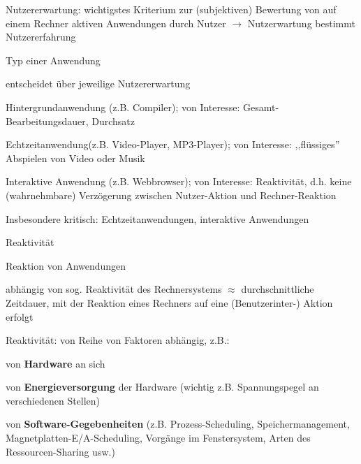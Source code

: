 \documentclass[a4paper]{article}
\begin{document}
\begin{multicols}{3}
    \begin{itemize*}
        \item
        Nutzererwartung: wichtigstes Kriterium zur (subjektiven) Bewertung von
        auf einem Rechner aktiven Anwendungen durch Nutzer
        $\rightarrow$ Nutzerwartung bestimmt Nutzererfahrung
        \item
        Typ einer Anwendung
        \begin{itemize*}
            \item entscheidet über jeweilige Nutzererwartung \begin{enumerate*} \item Hintergrundanwendung (z.B. Compiler); von Interesse: Gesamt-Bearbeitungsdauer, Durchsatz \item Echtzeitanwendung(z.B. Video-Player, MP3-Player); von Interesse: ,,flüssiges'' Abspielen von Video oder Musik \item Interaktive Anwendung (z.B. Webbrowser); von Interesse: Reaktivität, d.h. keine (wahrnehmbare) Verzögerung zwischen Nutzer-Aktion und Rechner-Reaktion \end{enumerate*}
            \item Insbesondere kritisch: Echtzeitanwendungen, interaktive Anwendungen
        \end{itemize*}
    \end{itemize*}

    Reaktivität

    \begin{itemize*}
        \item
        Reaktion von Anwendungen
        \begin{itemize*}
            \item abhängig von sog. Reaktivität des Rechnersystems $\approx$ durchschnittliche Zeitdauer, mit der Reaktion eines Rechners auf eine (Benutzerinter-) Aktion erfolgt
        \end{itemize*}
        \item
        Reaktivität: von Reihe von Faktoren abhängig, z.B.:
        \begin{enumerate*}

            \item von \textbf{Hardware} an sich
            \item von \textbf{Energieversorgung} der Hardware (wichtig z.B. Spannungspegel an verschiedenen Stellen)
            \item von \textbf{Software-Gegebenheiten} (z.B. Prozess-Scheduling, Speichermanagement, Magnetplatten-E/A-Scheduling, Vorgänge im Fenstersystem, Arten des Ressourcen-Sharing usw.)
        \end{enumerate*}
    \end{itemize*}


\end{multicols}
\end{document}
